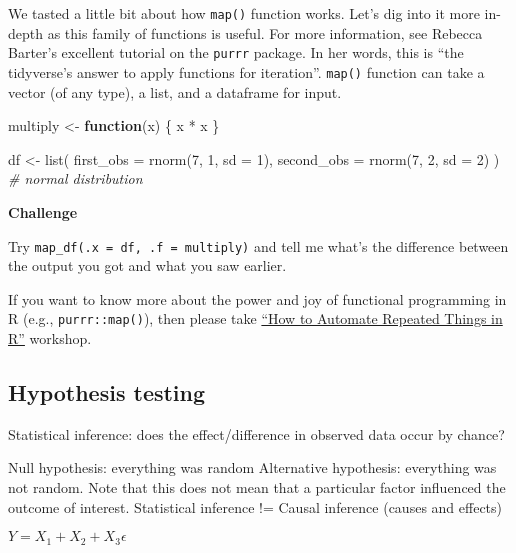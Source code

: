 \documentclass[
]{book}
\newenvironment{Shaded}{\begin{snugshade}}{\end{snugshade}}
\newcommand{\AttributeTok}[1]{\textcolor[rgb]{0.77,0.63,0.00}{#1}}
\newcommand{\CommentTok}[1]{\textcolor[rgb]{0.56,0.35,0.01}{\textit{#1}}}
\newcommand{\ControlFlowTok}[1]{\textcolor[rgb]{0.13,0.29,0.53}{\textbf{#1}}}
\newcommand{\DecValTok}[1]{\textcolor[rgb]{0.00,0.00,0.81}{#1}}
\newcommand{\FunctionTok}[1]{\textcolor[rgb]{0.00,0.00,0.00}{#1}}
\newcommand{\NormalTok}[1]{#1}
\newcommand{\OtherTok}[1]{\textcolor[rgb]{0.56,0.35,0.01}{#1}}
\newcommand{\SpecialCharTok}[1]{\textcolor[rgb]{0.00,0.00,0.00}{#1}}
\begin{document}
We tasted a little bit about how \texttt{map()} function works. Let's dig into it more in-depth as this family of functions is useful. For more information, see Rebecca Barter's excellent tutorial on the \texttt{purrr} package. In her words, this is ``the tidyverse's answer to apply functions for iteration''. \texttt{map()} function can take a vector (of any type), a list, and a dataframe for input.

\begin{Shaded}
\begin{Highlighting}[]
\NormalTok{multiply }\OtherTok{\textless{}{-}} \ControlFlowTok{function}\NormalTok{(x) \{}
\NormalTok{  x }\SpecialCharTok{*}\NormalTok{ x}
\NormalTok{\}}

\NormalTok{df }\OtherTok{\textless{}{-}} \FunctionTok{list}\NormalTok{(}
  \AttributeTok{first\_obs =} \FunctionTok{rnorm}\NormalTok{(}\DecValTok{7}\NormalTok{, }\DecValTok{1}\NormalTok{, }\AttributeTok{sd =} \DecValTok{1}\NormalTok{),}
  \AttributeTok{second\_obs =} \FunctionTok{rnorm}\NormalTok{(}\DecValTok{7}\NormalTok{, }\DecValTok{2}\NormalTok{, }\AttributeTok{sd =} \DecValTok{2}\NormalTok{)}
\NormalTok{) }\CommentTok{\# normal distribution}
\end{Highlighting}
\end{Shaded}

\textbf{Challenge}

Try \texttt{map\_df(.x\ =\ df,\ .f\ =\ multiply)} and tell me what's the difference between the output you got and what you saw earlier.

If you want to know more about the power and joy of functional programming in R (e.g., \texttt{purrr::map()}), then please take \href{https://github.com/dlab-berkeley/R-functional-programming}{``How to Automate Repeated Things in R''} workshop.

\hypertarget{hypothesis-testing}{%
\subsection{Hypothesis testing}\label{hypothesis-testing}}

Statistical inference: does the effect/difference in observed data occur by chance?

Null hypothesis: everything was random
Alternative hypothesis: everything was not random. Note that this does not mean that a particular factor influenced the outcome of interest. Statistical inference != Causal inference (causes and effects)

\(Y = X_{1} + X_{2} + X_{3} \epsilon\)
\end{document}
